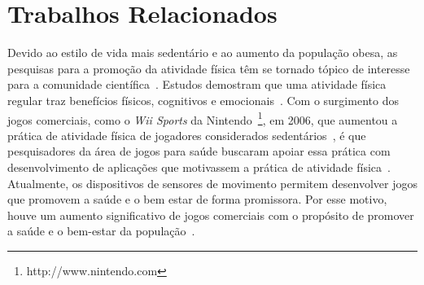 %
%
%
%



\section{Trabalhos Relacionados}\label{section:trabalhos_relacionados}
Devido ao estilo de vida mais sedentário e ao aumento da população obesa, as pesquisas para a promoção da atividade física têm se tornado tópico de interesse para a comunidade científica~\cite{maitland2009,bartolome11,Mandryk2014}. Estudos demostram que uma atividade física regular traz benefícios físicos, cognitivos e emocionais~\cite{Mandryk2014}. Com o surgimento dos jogos comerciais, como o \textit{Wii Sports} da Nintendo~\footnote{http://www.nintendo.com}, em 2006, que aumentou a prática de atividade física de jogadores considerados sedentários~\cite{wiigraves2008}, é que pesquisadores da área de jogos para saúde buscaram apoiar essa prática com desenvolvimento de aplicações que motivassem a prática de atividade física~\cite{stacey2011}. Atualmente, os dispositivos de sensores de movimento permitem desenvolver jogos que promovem a saúde e o bem estar de forma promissora. Por esse motivo, houve um aumento significativo de jogos comerciais com o propósito de promover a saúde e o bem-estar da população~\cite{Papastergiou:2009:EPC:1570538.1570707}.



